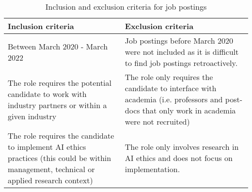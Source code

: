 


\begin{table*}[h]

\caption{Inclusion and exclusion criteria for job postings}
\label{tab:JP_criteria}

\begin{tabular}{p{}p{}}
\hline
Inclusion criteria              & Exclusion criteria                                                                                        \\ \hline
Between March 2020 - March 2022 & Job postings before March 2020 were not included as it is difficult to find job postings retroactively. \\ \hline
The role requires the potential candidate to work with industry partners or within a given industry &
  The role only requires the candidate to interface with academia (i.e. professors and post-docs that only work in academia were not recruited) \\ \hline
The role requires the candidate to implement \ac{AI} ethics practices (this could be within management, technical or applied research context) &
  The role only involves research in \ac{AI} ethics and does not focus on implementation. \\ \hline
\end{tabular}
\end{table*}


